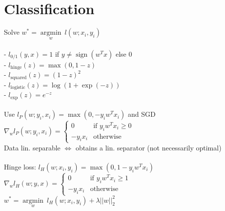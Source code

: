 \section*{Classification}

Solve $w^* = \underset{w}{\operatorname{argmin}} ~ l(w;x_i,y_i)$\\
\\
{- $l_{0/1} \left(y,x\right) = 1$  if $y \neq \operatorname{sign}\left(w^Tx\right)$ else 0}\\
- $l_{\text{hinge}}(z) = \max\left(0,1-z\right) $ \\
- $l_{\text{squared}}(z) = (1-z)^2$\hfill\\
- $l_{\text{logistic}}(z) = \log\left(1+\exp(-z)\right)$ \\
- $l_{\text{exp}}(z) = e^{-z}$ \\
\\
Use $l_P (w;y_i,x_i) = \operatorname{max}(0, -y_i w^T x_i)$ and SGD\\
$\nabla_w l_P(w;y_i,x_i) = 
\begin{cases}
    0 &\text{if } y_i w^T x_i \geq 0\\
    -y_i x_i &\text{otherwise}
\end{cases}$ \\
Data lin. separable $\Leftrightarrow$ obtains a lin. separator (not necessarily optimal)\\
\\
Hinge loss: $l_H(w;x_i,y_i) = \operatorname{max}(0,1-y_i w^T x_i)$ \\
$\nabla_w l_H(w;y,x) = 
\begin{cases}
    0 &\text{if } y_i w^T x_i \geq 1\\
    -y_i x_i &\text{otherwise}
\end{cases}$\\
$w^* = \underset{w}{\operatorname{argmin}} ~ l_H(w;x_i,y_i) + \lambda||w||_2^2$
